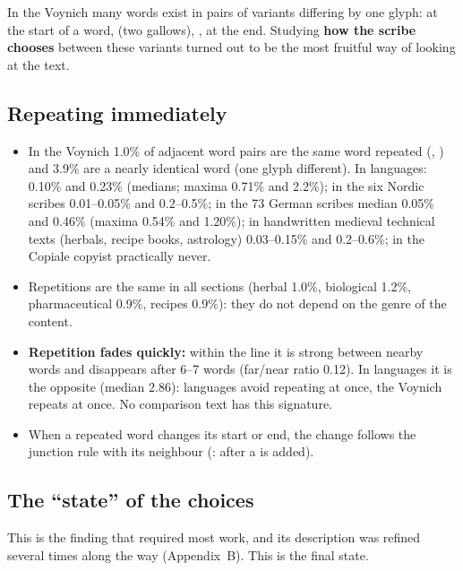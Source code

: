 In the Voynich many words exist in pairs of variants differing by one glyph:  at the start of a word,
 (two gallows), ,  at the end. Studying \textbf{how the scribe chooses} between these
variants turned out to be the most fruitful way of looking at the text.

\subsection{Repeating immediately}

\begin{itemize}
\item In the Voynich 1.0\% of adjacent word pairs are the same word repeated (, ) and
  3.9\% are a nearly identical word (one glyph different). In languages: 0.10\% and 0.23\% (medians; maxima 0.71\% and
  2.2\%); in the six Nordic scribes 0.01--0.05\% and 0.2--0.5\%; in the 73 German scribes median 0.05\% and 0.46\% (maxima
  0.54\% and 1.20\%); in handwritten medieval technical texts (herbals, recipe books, astrology) 0.03--0.15\% and
  0.2--0.6\%; in the Copiale copyist practically never.
\item Repetitions are the same in all sections (herbal 1.0\%, biological 1.2\%, pharmaceutical 0.9\%, recipes 0.9\%):
  they do not depend on the genre of the content.
\item \textbf{Repetition fades quickly:} within the line it is strong between nearby words and disappears after 6--7
  words (far/near ratio 0.12). In languages it is the opposite (median 2.86): languages avoid repeating at once, the
  Voynich repeats at once. No comparison text has this signature.
\item When a repeated word changes its start or end, the change follows the junction rule with its neighbour
  (: after  a  is added).
\end{itemize}

\subsection{The ``state'' of the choices}

This is the finding that required most work, and its description was refined several times along the way (Appendix~B).
This is the final state.

